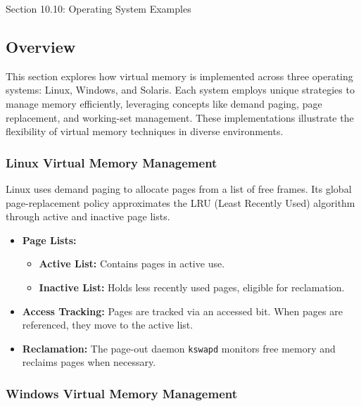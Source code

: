 \begin{notes}{Section 10.10: Operating System Examples}
    \subsection*{Overview}

    This section explores how virtual memory is implemented across three operating systems: Linux, Windows, and Solaris. Each system employs unique strategies to manage memory efficiently, leveraging 
    concepts like demand paging, page replacement, and working-set management. These implementations illustrate the flexibility of virtual memory techniques in diverse environments.
    
    \subsubsection*{Linux Virtual Memory Management}
    
    Linux uses demand paging to allocate pages from a list of free frames. Its global page-replacement policy approximates the LRU (Least Recently Used) algorithm through active and inactive page lists.
    
    \begin{highlight}
    
    \begin{itemize}
        \item \textbf{Page Lists:}
            \begin{itemize}
                \item \textbf{Active List:} Contains pages in active use.
                \item \textbf{Inactive List:} Holds less recently used pages, eligible for reclamation.
            \end{itemize}
        \item \textbf{Access Tracking:} Pages are tracked via an accessed bit. When pages are referenced, they move to the active list.
        \item \textbf{Reclamation:} The page-out daemon \texttt{kswapd} monitors free memory and reclaims pages when necessary.
    \end{itemize}
    
    \end{highlight}
    
    \subsubsection*{Windows Virtual Memory Management}
    

\end{notes}
